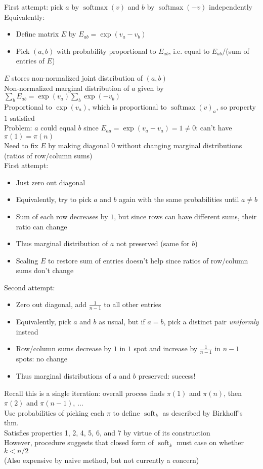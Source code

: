 \documentclass{article}
\DeclareMathOperator{\softmax}{softmax}
\DeclareMathOperator{\soft}{soft}
\begin{document}
First attempt: pick $a$ by $\softmax(v)$ and $b$ by $\softmax(-v)$ independently \\
Equivalently:
\begin{itemize}
  \item
    Define matrix $E$ by $E_{ab} = \exp(v_a-v_b)$
  \item
    Pick $(a, b)$ with probability proportional to $E_{ab}$,
    i.e. equal to $E_{ab}/$(sum of entries of $E$)
\end{itemize}
$E$ stores non-normalized joint distribution of $(a, b)$ \\
Non-normalized marginal distribution of $a$ given by
$\sum_b E_{ab} = \exp(v_a)\sum_b \exp(-v_b)$ \\
Proportional to $\exp(v_a)$, which is proportional to $\softmax(v)_a$,
so property $1$ satisfied \\
Problem: $a$ could equal $b$ since $E_{aa} = \exp(v_a-v_a) = 1 \neq 0$:
can't have $\pi(1)=\pi(n)$ \\
Need to fix $E$ by making diagonal $0$
without changing marginal distributions (ratios of row/column sums) \\
First attempt:
\begin{itemize}
  \item
    Just zero out diagonal
  \item
    Equivalently, try to pick $a$ and $b$ again with the same probabilities
    until $a \neq b$
  \item
    Sum of each row decreases by $1$,
    but since rows can have different sums,
    their ratio can change
  \item
    Thus marginal distribution of $a$ not preserved (same for $b$)
  \item
    Scaling $E$ to restore sum of entries doesn't help
    since ratios of row/column sums don't change
\end{itemize}
Second attempt:
\begin{itemize}
\item
  Zero out diagonal, add $\frac{1}{n-1}$ to all other entries
\item
  Equivalently, pick $a$ and $b$ as usual,
  but if $a=b$, pick a distinct pair \textit{uniformly} instead
\item
  Row/column sums decrease by $1$ in $1$ spot
  and increase by $\frac{1}{n-1}$ in $n-1$ spots:
  no change
\item
  Thus marginal distributions of $a$ and $b$ preserved: success!
\end{itemize}
Recall this is a single iteration:
overall process finds $\pi(1)$ and $\pi(n)$, then $\pi(2)$ and $\pi(n-1)$, $\ldots$ \\
Use probabilities of picking each $\pi$ to define $\soft_k$ as described by Birkhoff's thm. \\
Satisfies properties 1, 2, 4, 5, 6, and 7 by virtue of its construction \\
However, procedure suggests that closed form of $\soft_k$ must case on whether $k < n/2$ \\
(Also expensive by naive method, but not currently a concern)

\end{document}
